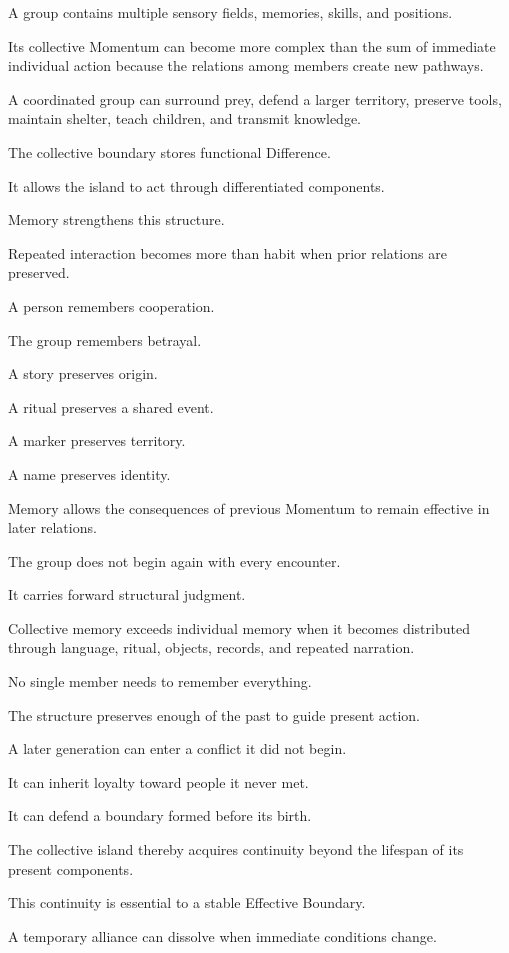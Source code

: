 A group contains multiple sensory fields, memories, skills, and positions.

Its collective Momentum can become more complex than the sum of immediate individual action because the relations among members create new pathways.

A coordinated group can surround prey, defend a larger territory, preserve tools, maintain shelter, teach children, and transmit knowledge.

The collective boundary stores functional Difference.

It allows the island to act through differentiated components.

Memory strengthens this structure.

Repeated interaction becomes more than habit when prior relations are preserved.

A person remembers cooperation.

The group remembers betrayal.

A story preserves origin.

A ritual preserves a shared event.

A marker preserves territory.

A name preserves identity.

Memory allows the consequences of previous Momentum to remain effective in later relations.

The group does not begin again with every encounter.

It carries forward structural judgment.

Collective memory exceeds individual memory when it becomes distributed through language, ritual, objects, records, and repeated narration.

No single member needs to remember everything.

The structure preserves enough of the past to guide present action.

A later generation can enter a conflict it did not begin.

It can inherit loyalty toward people it never met.

It can defend a boundary formed before its birth.

The collective island thereby acquires continuity beyond the lifespan of its present components.

This continuity is essential to a stable Effective Boundary.

A temporary alliance can dissolve when immediate conditions change.

